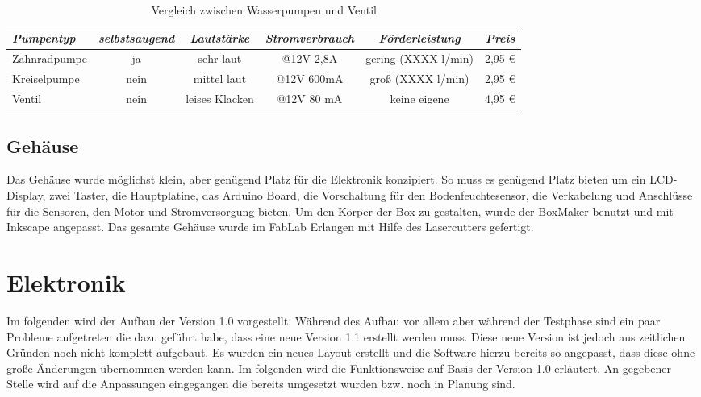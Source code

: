 \documentclass[]{IEEEtran}
\begin{document}
	\begin{table*}[!t]
	

	\begin{tabular}{|lccccc|}
	\hline
	\textit{Pumpentyp} & \textit{selbstsaugend} & \textit{Lautstärke} & \textit{Stromverbrauch} & \textit{Förderleistung} & \textit{Preis} \\ \hline
	Zahnradpumpe & ja & sehr laut & @12V 2,8A & gering (XXXX l/min)& 2,95 \euro  \\
	Kreiselpumpe & nein & mittel laut & @12V 600mA & groß (XXXX l/min)& 2,95 \euro \\
	Ventil & nein & leises Klacken & @12V 80 mA & keine eigene & 4,95 \euro \\
	\hline
	\end{tabular}
	\caption{Vergleich zwischen Wasserpumpen und Ventil}
	\label{Vergleich zwischen Wasserpumpen und Ventil}
	
	\end{table*}	
	
	\subsection{Gehäuse}
	Das Gehäuse wurde möglichst klein, aber genügend Platz für die Elektronik konzipiert.
	So muss es genügend Platz bieten um ein LCD-Display, zwei Taster, die Hauptplatine, das Arduino Board,  die Vorschaltung für den Bodenfeuchtesensor, die Verkabelung und Anschlüsse für die Sensoren, den Motor und Stromversorgung  bieten.
	Um den Körper der Box zu gestalten, wurde der BoxMaker benutzt und mit Inkscape angepasst. 
	Das gesamte Gehäuse wurde im FabLab Erlangen mit Hilfe des Lasercutters gefertigt.
	
\section{Elektronik}
	Im folgenden wird der Aufbau der Version 1.0 vorgestellt. Während des Aufbau vor allem aber während der Testphase sind ein paar Probleme aufgetreten die dazu geführt habe, dass eine neue Version 1.1 erstellt werden muss. Diese neue Version ist jedoch aus zeitlichen Gründen noch nicht komplett aufgebaut. Es wurden ein neues Layout erstellt und die Software hierzu bereits so angepasst, dass diese ohne große Änderungen übernommen werden kann. Im folgenden wird die Funktionsweise auf Basis der Version 1.0 erläutert. An gegebener Stelle wird auf die  Anpassungen eingegangen die bereits umgesetzt wurden bzw. noch in Planung sind. 
\end{document}
